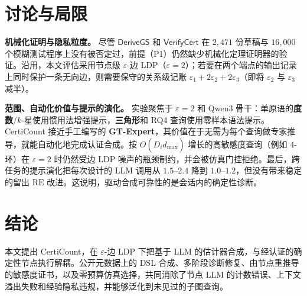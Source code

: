 \documentclass[11pt]{article}
\newlength{\zhindent}
\newcommand{\parhead}[1]{\par\noindent\hspace*{\zhindent}\textbf{#1}}
\theoremstyle{ieeeitalic}
\newcommand{\dhatmax}{\hat{d}_{\max}}
\newcommand{\RE}{\mathrm{RE}}
\newcommand{\DeriveGS}{\mathsf{DeriveGS}}
\newcommand{\VerifyCert}{\mathsf{VerifyCert}}
\begin{document}
\section{讨论与局限}
\label{sec:discussion}

\parhead{机械化证明与隐私粒度。}
尽管 $\DeriveGS$ 和 $\VerifyCert$ 在 $2{,}471$ 份草稿与 $16{,}000$ 个模糊测试程序上没有被否定过，前提（P1）仍然缺少机械化定理证明器的验证。沿用\cite{imola2021locally,zhang2026psc}，本文评估采用节点级 $\varepsilon$-边 LDP（$\varepsilon=2$）；若要在两个端点的输出记录上同时保护一条无向边，则需要保守的关系级记账 $\varepsilon_1 + 2\varepsilon_2 + 2\varepsilon_3$（即将 $\varepsilon_2$ 与 $\varepsilon_3$ 减半）。

\parhead{范围、自动化价值与提示的演化。}
实验聚焦于 $\varepsilon=2$ 和 Qwen3 骨干：单原语的\textbf{度数}/$k$-星使用惯用法增强提示，\textbf{三角形}和 RQ4 查询使用零样本语法提示。CertiCount 接近手工编写的 \textbf{GT-Expert}，其价值在于无需为每个查询做专家推导，就能自动化地完成认证合成。按 $O(D_i \dhatmax)$ 增长的高敏感度查询（例如 $4$-环）在 $\varepsilon=2$ 时仍然受边 LDP 噪声的瓶颈制约，并会被仿真门控拒绝。最后，跨任务的提示演化把每次设计的 LLM 调用从 $1.5$--$2.4$ 降到 $1.0$--$1.2$，但没有带来稳定的留出 $\RE$ 改进。这说明，驱动合成可靠性的是会话内的确定性诊断。

\section{结论}
\label{sec:conclusion}

本文提出 CertiCount，在 $\varepsilon$-边 LDP 下把基于 LLM 的估计器合成，与经认证的确定性节点执行解耦。公开元数据上的 DSL 合成、多阶段诊断修复、由节点重推导的敏感度证书，以及零预算仿真选择，共同消除了节点 LLM 的计数错误、上下文溢出失败和经验隐私违规，并能够泛化到未见过的子图查询。

\makeatletter
\let\@mkboth\@gobbletwo
\makeatother


\end{document}
